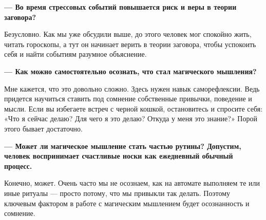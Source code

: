 \textbf{--- Во время стрессовых событий повышается риск  и веры в теории заговора?}

Безусловно. Как мы уже обсудили выше, до этого человек мог спокойно жить, читать гороскопы, а тут он начинает верить в теории заговора, чтобы успокоить себя и найти событиям разумное объяснение.

\textbf{--- Как можно самостоятельно осознать, что стал  магического мышления?}

Мне кажется, что это довольно сложно. Здесь нужен навык саморефлексии. Ведь придется научиться ставить под сомнение собственные привычки, поведение и мысли. Если вы избегаете встреч с черной кошкой, остановитесь и спросите себя: «Что я сейчас делаю? Для чего я это делаю? Откуда у меня это знание?» Порой этого бывает достаточно.

\textbf{--- Может ли магическое мышление стать частью рутины? Допустим, человек воспринимает счастливые носки как ежедневный обычный процесс.}

Конечно, может. Очень часто мы не осознаем, как на автомате выполняем те или иные ритуалы — просто потому, что мы привыкли так делать. Поэтому ключевым фактором в работе с магическим мышлением будет осознанность и сомнение.

\clearpage


